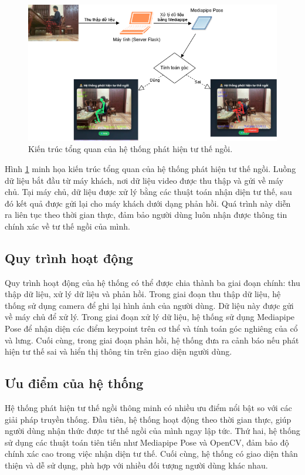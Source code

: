 \documentclass[conference]{IEEEtran}
\begin{document}
\begin{figure}[H]
    \centering
    \includegraphics[width=0.9\linewidth]{images/system_architecture.png}
    \caption{Kiến trúc tổng quan của hệ thống phát hiện tư thế ngồi.}
    \label{fig:system_architecture}
\end{figure}

Hình \ref{fig:system_architecture} minh họa kiến trúc tổng quan của hệ thống phát hiện tư thế ngồi. Luồng dữ liệu bắt đầu từ máy khách, nơi dữ liệu video được thu thập và gửi về máy chủ. Tại máy chủ, dữ liệu được xử lý bằng các thuật toán nhận diện tư thế, sau đó kết quả được gửi lại cho máy khách dưới dạng phản hồi. Quá trình này diễn ra liên tục theo thời gian thực, đảm bảo người dùng luôn nhận được thông tin chính xác về tư thế ngồi của mình.

\subsection{Quy trình hoạt động}
Quy trình hoạt động của hệ thống có thể được chia thành ba giai đoạn chính: thu thập dữ liệu, xử lý dữ liệu và phản hồi. Trong giai đoạn thu thập dữ liệu, hệ thống sử dụng camera để ghi lại hình ảnh của người dùng. Dữ liệu này được gửi về máy chủ để xử lý. Trong giai đoạn xử lý dữ liệu, hệ thống sử dụng Mediapipe Pose để nhận diện các điểm keypoint trên cơ thể và tính toán góc nghiêng của cổ và lưng. Cuối cùng, trong giai đoạn phản hồi, hệ thống đưa ra cảnh báo nếu phát hiện tư thế sai và hiển thị thông tin trên giao diện người dùng.

\subsection{Ưu điểm của hệ thống}
Hệ thống phát hiện tư thế ngồi thông minh có nhiều ưu điểm nổi bật so với các giải pháp truyền thống. Đầu tiên, hệ thống hoạt động theo thời gian thực, giúp người dùng nhận thức được tư thế ngồi của mình ngay lập tức. Thứ hai, hệ thống sử dụng các thuật toán tiên tiến như Mediapipe Pose và OpenCV, đảm bảo độ chính xác cao trong việc nhận diện tư thế. Cuối cùng, hệ thống có giao diện thân thiện và dễ sử dụng, phù hợp với nhiều đối tượng người dùng khác nhau.
\end{document}
